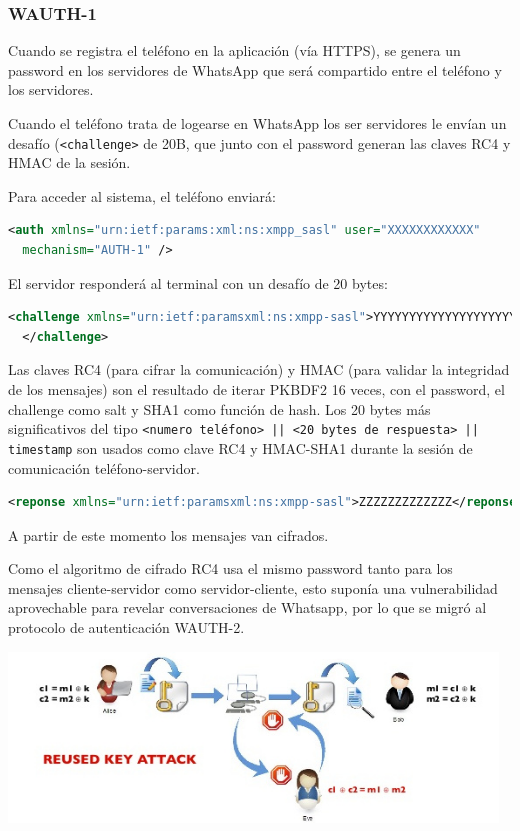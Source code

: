 \documentclass[a4paper, 11pt]{article} %
\begin{document}
    \subsubsection{WAUTH-1}
      Cuando se registra el teléfono en la aplicación (vía HTTPS), se genera un password en los servidores
      de WhatsApp que será compartido entre el teléfono y los servidores.

      Cuando el teléfono trata de logearse en WhatsApp los ser servidores le envían un desafío 
      (\texttt{<challenge>} de 20B, que junto con el password generan las claves RC4 y HMAC de la sesión. 

      Para acceder al sistema, el teléfono enviará:
      \begin{lstlisting}[language=XML]
  <auth xmlns="urn:ietf:params:xml:ns:xmpp_sasl" user="XXXXXXXXXXXX"
  mechanism="AUTH-1" />
      \end{lstlisting}

      El servidor responderá al terminal con un desafío de 20 bytes:
      \begin{lstlisting}[language=XML]
  <challenge xmlns="urn:ietf:paramsxml:ns:xmpp-sasl">YYYYYYYYYYYYYYYYYYYY
  </challenge>
      \end{lstlisting}

      Las claves RC4 (para cifrar la comunicación) y HMAC (para validar la integridad de los mensajes) son el resultado 
      de iterar PKBDF2 16 veces, con el password, el challenge como salt y SHA1 como función de hash. Los 20 bytes más
      significativos del tipo \texttt{<numero teléfono> || <20 bytes de respuesta> || timestamp} son usados como clave
      RC4 y HMAC-SHA1 durante la sesión de comunicación teléfono-servidor.

      \begin{lstlisting}[language=XML]
  <reponse xmlns="urn:ietf:paramsxml:ns:xmpp-sasl">ZZZZZZZZZZZZZ</reponse>
      \end{lstlisting}

      A partir de este momento los mensajes van cifrados.

      Como el algoritmo de cifrado RC4 usa el mismo password tanto para los mensajes cliente-servidor como servidor-cliente,
      esto suponía una vulnerabilidad aprovechable para revelar conversaciones de Whatsapp, por lo que se migró al protocolo
      de autenticación WAUTH-2.
      
      \begin{center}
	\includegraphics[width=13cm]{wauth-1.jpg}
      \end{center}
      
\end{document}
